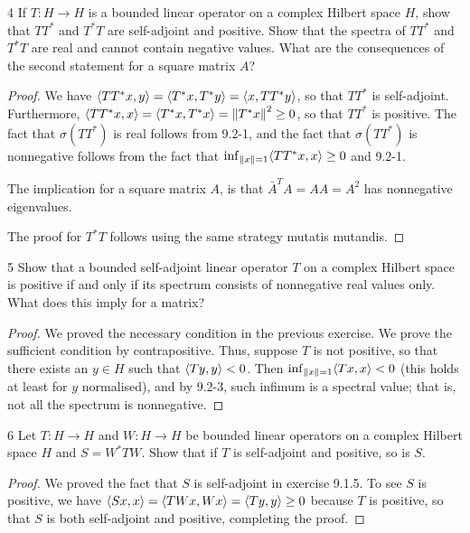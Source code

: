 \begin{exercise}{4}
If $T: H \to H$ is a bounded linear operator on a complex Hilbert space $H$, show that $T T^\ast$ and $T^\ast T$ are self-adjoint and positive.
Show that the spectra of $T T^\ast$ and $T^\ast T$ are real and cannot contain negative values.
What are the consequences of the second statement for a square matrix $A$?
\end{exercise}
\begin{proof}
We have $\langle T T^\ast x, y\rangle = \langle T^\ast x, T^\ast y\rangle = \langle x, TT^\ast y\rangle$, so that $T T^\ast$ is self-adjoint.
Furthermore, $\langle T T^\ast x, x\rangle = \langle T^\ast x, T^\ast x\rangle = \left\lVert T^\ast x\right\rVert^2 \geq 0$, so that $T T^\ast$ is positive.
The fact that $\sigma(T T^\ast)$ is real follows from 9.2-1, and the fact that $\sigma(T T^\ast)$ is nonnegative follows from the fact that $\inf_{\left\lVert x\right\rVert = 1} \langle T T^\ast x, x\rangle \geq 0$ and 9.2-1.

The implication for a square matrix $A$, is that $\bar{A}^T A = A A = A^2$ has nonnegative eigenvalues.

The proof for $T^\ast T$ follows using the same strategy mutatis mutandis.
\end{proof} 

\begin{exercise}{5}
Show that a bounded self-adjoint linear operator $T$ on a complex Hilbert space is positive if and only if its spectrum consists of nonnegative real values only.
What does this imply for a matrix?
\end{exercise}
\begin{proof}
We proved the necessary condition in the previous exercise.
We prove the sufficient condition by contrapositive.
Thus, suppose $T$ is not positive, so that there exists an $y \in H$ such that $\langle Ty, y\rangle < 0$.
Then $\inf_{\left\lVert x\right\rVert = 1} \langle Tx, x\rangle < 0$ (this holds at least for $y$ normalised), and by 9.2-3, such infimum is a spectral value;
that is, not all the spectrum is nonnegative.
\end{proof} 

\begin{exercise}{6}
Let $T: H \to H$ and $W: H \to H$ be bounded linear operators on a complex Hilbert space $H$ and $S = W^\ast T W$.
Show that if $T$ is self-adjoint and positive, so is $S$.
\end{exercise}
\begin{proof}
We proved the fact that $S$ is self-adjoint in exercise 9.1.5.
To see $S$ is positive, we have $\langle Sx, x\rangle = \langle TWx, Wx\rangle = \langle Ty, y\rangle \geq 0$ because $T$ is positive, so that $S$ is both self-adjoint and positive, completing the proof.
\end{proof} 

